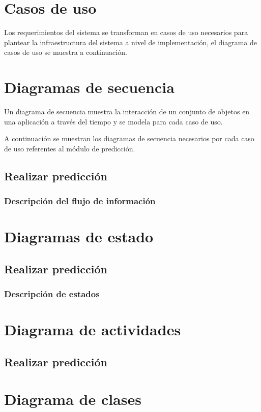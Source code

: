 \section{Casos de uso}
Los requerimientos del sistema se transforman en casos de uso necesarios para plantear la infraestructura del sistema a nivel de implementación, el diagrama de casos de uso se muestra a continuación.

\section{Diagramas de secuencia}
Un diagrama de secuencia muestra la interacción de un conjunto de objetos en una aplicación a través del tiempo y se modela para cada caso de uso.

A continuación se muestran los diagramas de secuencia necesarios por cada caso de uso referentes al módulo de predicción.
\subsection{Realizar predicción}

\subsubsection{Descripción del flujo de información}

\section{Diagramas de estado}

\subsection{Realizar predicción}

\subsubsection{Descripción de estados}

\section{Diagrama de actividades}

\subsection{Realizar predicción}

\section{Diagrama de clases}

